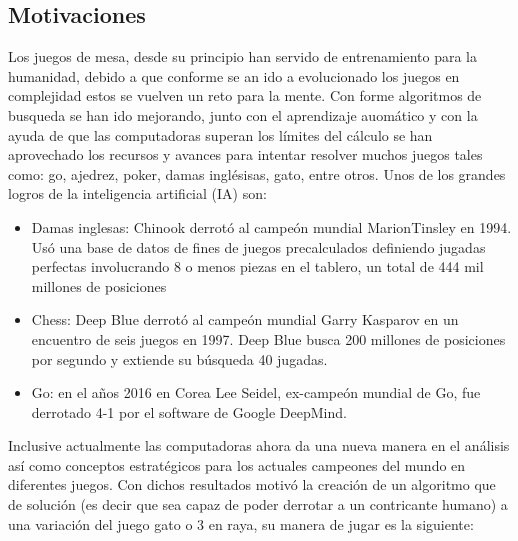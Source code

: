 \documentclass[runningheads]{llncs}
\begin{document}
\subsection{Motivaciones}
Los juegos de mesa, desde su principio han servido de entrenamiento para la humanidad, debido a que conforme se an ido a evolucionado los juegos en complejidad estos se vuelven un reto para la mente. Con forme algoritmos de busqueda se han ido mejorando, junto con el aprendizaje auomático y con la ayuda de que las computadoras superan los límites del cálculo se han aprovechado los recursos y avances para intentar resolver muchos juegos tales como: go, ajedrez, poker, damas inglésisas, gato, entre otros. 
Unos de los grandes logros de la inteligencia artificial (IA) son:
\begin{itemize}
    \item Damas inglesas: Chinook derrotó al campeón mundial MarionTinsley en 1994. Usó una base de datos de fines de juegos precalculados definiendo jugadas perfectas involucrando 8 o menos piezas en el tablero, un total de 444 mil millones de posiciones
    \item Chess: Deep Blue derrotó al campeón mundial Garry Kasparov en un encuentro de seis juegos en 1997. Deep Blue busca 200 millones de posiciones por segundo y extiende su búsqueda 40 jugadas.
    \item Go: en el años 2016 en Corea Lee Seidel, ex-campeón mundial de Go, fue derrotado 4-1 por el software de Google DeepMind.
\end{itemize}

Inclusive actualmente las computadoras ahora da una nueva manera en el análisis así como conceptos estratégicos para los actuales campeones del mundo en diferentes juegos. Con dichos resultados motivó la creación de un algoritmo que de solución (es decir que sea capaz de poder derrotar a un contricante humano) a una variación del juego gato o 3 en raya, su manera de jugar es la siguiente:
\end{document}

